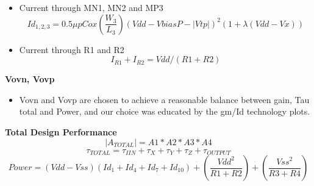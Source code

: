 \documentclass[12pt,a4paper]{article}
\begin{document}
\begin{itemize}
	\item Current through MN1, MN2 and MP3
	\begin{equation}
		Id_{1,2,3}=0.5\mu pCox(\frac{W_3}{L_3})(Vdd-VbiasP-|Vtp|)^{2} (1+\lambda (Vdd-Vx))
	\end{equation}
	\item Current through R1 and R2
	\begin{equation}
		I_{R1}+I_{R2}=Vdd/(R1+R2)
	\end{equation}
\end{itemize}

\textbf{Vovn, Vovp}

\begin{itemize}
	\item Vovn and Vovp are chosen to achieve a reasonable balance between gain, Tau total and Power, and our choice was educated by the gm/Id technology plots.
\end{itemize}
	
\textbf{Total Design Performance}
\begin{equation}
	|A_{TOTAL}|=A1* A2* A3* A4
\end{equation}
\begin{equation}
	\tau_{TOTAL}=\tau_{IIN}+\tau_X+\tau_Y+\tau_Z+\tau_{OUTPUT}
\end{equation}
\begin{equation}
	Power=(Vdd-Vss)(Id_1+Id_4+Id_7+Id_{10})+(\frac{Vdd^{2}}{R1+R2})+(\frac{Vss^{2}}{R3+R4})
\end{equation}
\end{document}
